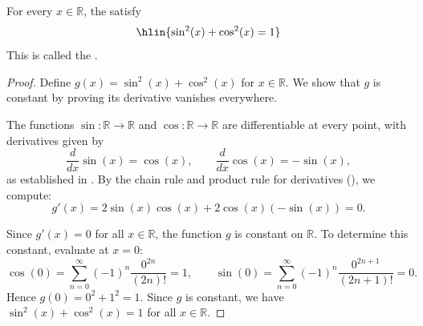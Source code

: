 \begin{proposition} \label{proposition:pythagorean_identity_for_real_sine_and_cosine_functions}
For every $x \in \mathbb{R}$, the  satisfy
$$\hlin{\sin^2(x) + \cos^2(x) = 1}$$
This is called the .
\end{proposition}
\begin{proof}
    Define $g(x) = \sin^2(x) + \cos^2(x)$ for $x \in \mathbb{R}$. We show that $g$ is constant by proving its derivative vanishes everywhere.

    The functions $\sin : \mathbb{R} \to \mathbb{R}$ and $\cos : \mathbb{R} \to \mathbb{R}$ are differentiable at every point, with derivatives given by
    $$\frac{d}{dx}\sin(x) = \cos(x), \qquad \frac{d}{dx}\cos(x) = -\sin(x),$$
    as established in . By the chain rule and product rule for derivatives (), we compute:
    $$g'(x) = 2\sin(x)\cos(x) + 2\cos(x)(-\sin(x)) = 0.$$

    Since $g'(x) = 0$ for all $x \in \mathbb{R}$, the function $g$ is constant on $\mathbb{R}$. To determine this constant, evaluate at $x = 0$:
    $$\cos(0) = \sum_{n=0}^\infty (-1)^n \frac{0^{2n}}{(2n)!} = 1, \qquad \sin(0) = \sum_{n=0}^\infty (-1)^n \frac{0^{2n+1}}{(2n+1)!} = 0.$$
    Hence $g(0) = 0^2 + 1^2 = 1$. Since $g$ is constant, we have $\sin^2(x) + \cos^2(x) = 1$ for all $x \in \mathbb{R}$.
\end{proof}
